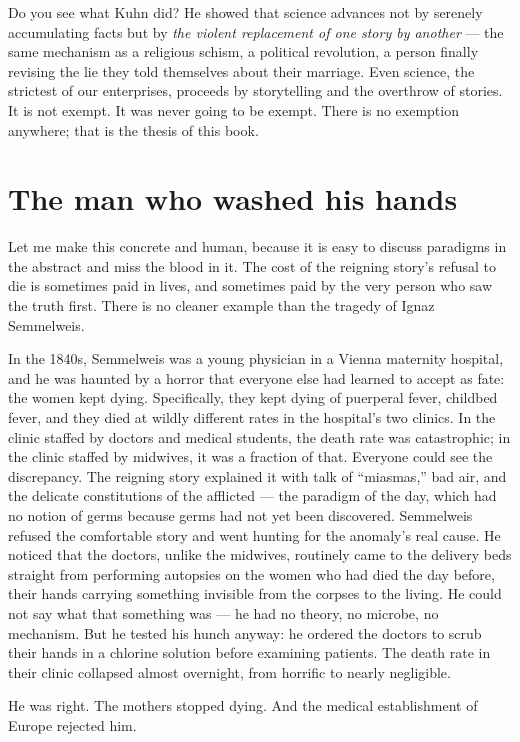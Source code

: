 Do you see what Kuhn did? He showed that science advances not by serenely accumulating facts but by \emph{the violent replacement of one story by another} — the same mechanism as a religious schism, a political revolution, a person finally revising the lie they told themselves about their marriage. Even science, the strictest of our enterprises, proceeds by storytelling and the overthrow of stories. It is not exempt. It was never going to be exempt. There is no exemption anywhere; that is the thesis of this book.

\section*{The man who washed his hands}

Let me make this concrete and human, because it is easy to discuss paradigms in the abstract and miss the blood in it. The cost of the reigning story's refusal to die is sometimes paid in lives, and sometimes paid by the very person who saw the truth first. There is no cleaner example than the tragedy of Ignaz Semmelweis.

In the 1840s, Semmelweis was a young physician in a Vienna maternity hospital, and he was haunted by a horror that everyone else had learned to accept as fate: the women kept dying. Specifically, they kept dying of puerperal fever, childbed fever, and they died at wildly different rates in the hospital's two clinics. In the clinic staffed by doctors and medical students, the death rate was catastrophic; in the clinic staffed by midwives, it was a fraction of that. Everyone could see the discrepancy. The reigning story explained it with talk of ``miasmas,'' bad air, and the delicate constitutions of the afflicted — the paradigm of the day, which had no notion of germs because germs had not yet been discovered. Semmelweis refused the comfortable story and went hunting for the anomaly's real cause. He noticed that the doctors, unlike the midwives, routinely came to the delivery beds straight from performing autopsies on the women who had died the day before, their hands carrying something invisible from the corpses to the living. He could not say what that something was — he had no theory, no microbe, no mechanism. But he tested his hunch anyway: he ordered the doctors to scrub their hands in a chlorine solution before examining patients. The death rate in their clinic collapsed almost overnight, from horrific to nearly negligible.

He was right. The mothers stopped dying. And the medical establishment of Europe rejected him.

